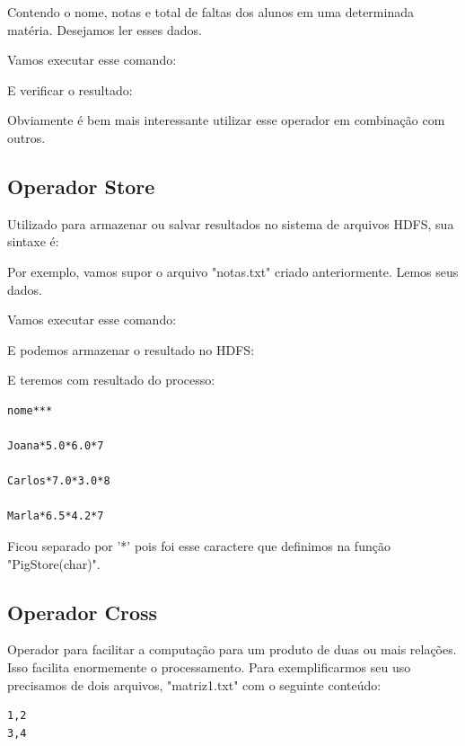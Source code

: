 \documentclass[a4paper,11pt]{article}
\begin{document}
Contendo o nome, notas e total de faltas dos alunos em uma determinada matéria. Desejamos ler esses dados. \\

Vamos executar esse comando: \\

E verificar o resultado: \\

Obviamente é bem mais interessante utilizar esse operador em combinação com outros.

\subsection{Operador Store}
Utilizado para armazenar ou salvar resultados no sistema de arquivos HDFS, sua sintaxe é: \\

Por exemplo, vamos supor o arquivo "notas.txt" criado anteriormente. Lemos seus dados. \\

Vamos executar esse comando: \\

E podemos armazenar o resultado no HDFS: \\

E teremos com resultado do processo:
\begin{lstlisting}[]
nome***

Joana*5.0*6.0*7

Carlos*7.0*3.0*8

Marla*6.5*4.2*7

\end{lstlisting}

Ficou separado por '*' pois foi esse caractere que definimos na função "PigStore(char)".

\subsection{Operador Cross}
Operador para facilitar a computação para um produto de duas ou mais relações. Isso facilita enormemente o processamento. Para exemplificarmos seu uso precisamos de dois arquivos, "matriz1.txt" com o seguinte conteúdo:
\begin{lstlisting}[]
1,2
3,4
\end{lstlisting}
\end{document}

